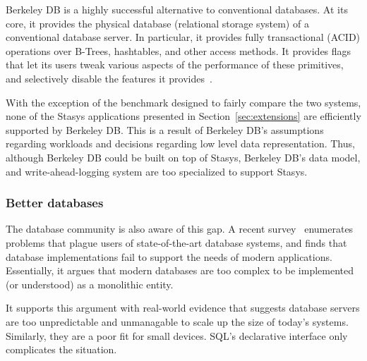 \documentclass[letterpaper,twocolumn,10pt]{article}
\newcommand{\yad}{Stasys\xspace}
\begin{document}

Berkeley DB is a highly successful alternative to conventional
databases.  At its core, it provides the physical database
(relational storage system) of a conventional database server.
In particular, 
it provides fully transactional (ACID) operations over B-Trees, 
hashtables, and other access methods.  It provides flags that 
let its users tweak various aspects of the performance of these
primitives, and selectively disable the features it provides~\cite{libtp}.

With the
exception of the benchmark designed to fairly compare the two systems, none of the \yad 
applications presented in Section~\ref{sec:extensions} are efficiently
supported by Berkeley DB.   This is a result of Berkeley DB's  
assumptions regarding workloads and decisions regarding low level data
representation.  Thus, although Berkeley DB could be built on top of \yad,
Berkeley DB's data model, and write-ahead-logging system are too specialized to support \yad.





\subsubsection{Better databases}

The database community is also aware of this gap. 
A recent survey~\cite{riscDB} enumerates problems that plague users of
state-of-the-art database systems, and finds that database implementations fail to support the
needs of modern applications.  Essentially, it argues that modern 
databases are too complex to be implemented (or understood) 
as a monolithic entity.

It supports this argument with real-world evidence that suggests
database servers are too unpredictable and unmanagable to
scale up the size of today's systems.  Similarly, they are a poor fit
for small devices.  SQL's declarative interface only complicates the
situation.
\end{document}
